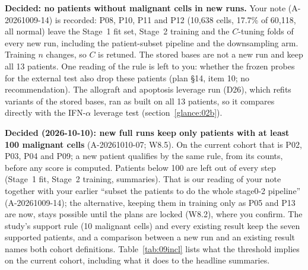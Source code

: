 \textbf{Decided: no patients without malignant cells in new runs.} Your note (A-20261009-14) is recorded: P08, P10, P11 and P12 (10,638 cells, 17.7\% of 60,118, all normal) leave the Stage~1 fit set, Stage~2 training and the $C$-tuning folds of every new run, including the patient-subset pipeline and the downsampling arm. Training $n$ changes, so $C$ is retuned. The stored bases are not a new run and keep all 13 patients. One reading of the rule is left to you: whether the frozen probes for the external test also drop these patients (plan \S14, item 10; no recommendation). The allograft and apoptosis leverage run (D26), which refits variants of the stored bases, ran as built on all 13 patients, so it compares directly with the IFN-$\alpha$ leverage test (section~\ref{glance:02b}).

\textbf{Decided (2026-10-10): new full runs keep only patients with at least 100 malignant cells} (A-20261010-07; W8.5). On the current cohort that is P02, P03, P04 and P09; a new patient qualifies by the same rule, from its counts, before any score is computed. Patients below 100 are left out of every step (Stage~1 fit, Stage~2 training, summaries). That is our reading of your note together with your earlier ``subset the patients to do the whole stage0-2 pipeline'' (A-20261009-14); the alternative, keeping them in training only as P05 and P13 are now, stays possible until the plans are locked (W8.2), where you confirm. The study's support rule (10 malignant cells) and every existing result keep the seven supported patients, and a comparison between a new run and an existing result names both cohort definitions. Table~\ref{tab:09incl} lists what the threshold implies on the current cohort, including what it does to the headline summaries. 

